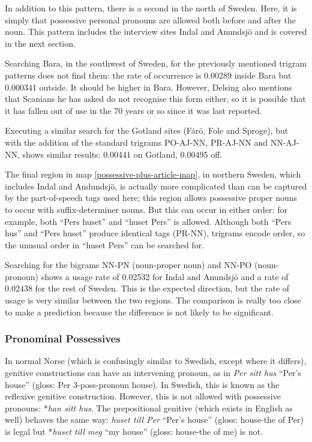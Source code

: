 In addition to this pattern, there is a second in the north of
Sweden. Here, it is simply that possessive personal pronouns are
allowed both before and after the noun. This pattern includes the
interview sites Indal and Anundsj\"o and is covered in the next
section.

Searching Bara, in the southwest of Sweden, for the previously
mentioned trigram patterns does not find them: the rate of occurrence
is 0.00289 inside Bara but 0.000341 outside. It should be higher in
Bara. However, Delsing also mentions that Scanians he has asked do not
recognise this form either, so it is possible that it has fallen out
of use in the 70 years or so since it was last reported.

Executing a similar search for the Gotland sites (F\.ar\"o, Fole and
Sproge), but with the addition of the standard trigrams PO-AJ-NN,
PR-AJ-NN and NN-AJ-NN, shows similar results: 0.00441 on Gotland,
0.00495 off.

The final region in map \ref{possessive-plus-article-map}, in northern
Sweden, which includes Indal and Andundsj\"o, is actually more
complicated than can be captured by the part-of-speech tags used here;
this region allows possessive proper nouns to occur with
suffix-determiner nouns. But this can occur in either order: for
example, both ``Pers huset'' and ``huset Pers'' is allowed. Although
both ``Pers hus'' and ``Pers huset'' produce identical tags (PR-NN),
trigrams encode order, so the unusual order in ``huset Pers'' can be
searched for.

Searching for the bigrams NN-PN (noun-proper noun) and NN-PO
(noun-pronoun) shows a usage rate of 0.02532 for Indal and Anundsj\"o
and a rate of 0.02438 for the rest of Sweden. This is the expected
direction, but the rate of usage is very similar between the two
regions. The comparison is really too close to make a prediction
because the difference is not likely to be significant.

\subsubsection{Pronominal Possessives}

In normal Norse (which is confusingly similar to Swedish, except
where it differs), genitive constructions can have an intervening
pronoun, as in {\it Per sitt hus} ``Per's house'' (gloss: Per
3-poss-pronoun house). In Swedish, this is known as the reflexive genitive
construction. However, this is not allowed with possessive pronouns:
*{\it han sitt hus}. The prepositional genitive (which exists in
English as well) behaves the same way: {\it huset till Per} ``Per's
house'' (gloss: house-the of Per) is legal but *{\it huset till meg}
``my house'' (gloss: house-the of me) is not.

